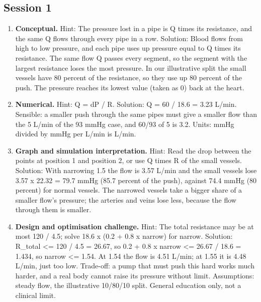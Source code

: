 \documentclass[11pt,a4paper]{article}
\begin{document}
\subsection*{Session 1}
\begin{enumerate}[nosep]
\item \textbf{Conceptual.} Hint: The pressure lost in a pipe is Q times its resistance, and the same Q flows through every pipe in a row. Solution: Blood flows from high to low pressure, and each pipe uses up pressure equal to Q times its resistance. The same flow Q passes every segment, so the segment with the largest resistance loses the most pressure. In our illustrative split the small vessels have 80 percent of the resistance, so they use up 80 percent of the push. The pressure reaches its lowest value (taken as 0) back at the heart.
\item \textbf{Numerical.} Hint: Q = dP / R. Solution: Q = 60 / 18.6 = 3.23 L/min. Sensible: a smaller push through the same pipes must give a smaller flow than the 5 L/min of the 93 mmHg case, and 60/93 of 5 is 3.2. Units: mmHg divided by mmHg per L/min is L/min.
\item \textbf{Graph and simulation interpretation.} Hint: Read the drop between the points at position 1 and position 2, or use Q times R of the small vessels. Solution: With narrowing 1.5 the flow is 3.57 L/min and the small vessels lose 3.57 x 22.32 = 79.7 mmHg (85.7 percent of the push), against 74.4 mmHg (80 percent) for normal vessels. The narrowed vessels take a bigger share of a smaller flow's pressure; the arteries and veins lose less, because the flow through them is smaller.
\item \textbf{Design and optimisation challenge.} Hint: The total resistance may be at most 120 / 4.5; solve 18.6 x (0.2 + 0.8 x narrow) for narrow. Solution: R\_total \textless{}= 120 / 4.5 = 26.67, so 0.2 + 0.8 x narrow \textless{}= 26.67 / 18.6 = 1.434, so narrow \textless{}= 1.54. At 1.54 the flow is 4.51 L/min; at 1.55 it is 4.48 L/min, just too low. Trade-off: a pump that must push this hard works much harder, and a real body cannot raise its pressure without limit. Assumptions: steady flow, the illustrative 10/80/10 split. General education only, not a clinical limit.
\end{enumerate}
\end{document}
